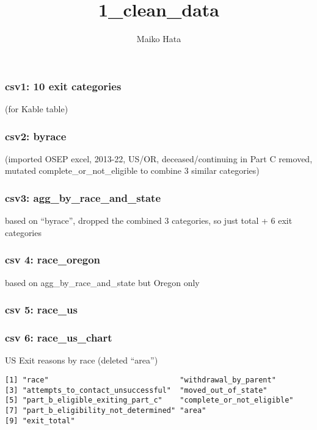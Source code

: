 \documentclass[
  letterpaper,
  DIV=11,
  numbers=noendperiod]{scrartcl}
\title{1\_clean\_data}
\author{Maiko Hata}
\date{}
\begin{document}
\maketitle


\subsubsection{csv1: 10 exit categories}\label{csv1-10-exit-categories}

(for Kable table)

\subsubsection{csv2: byrace}\label{csv2-byrace}

(imported OSEP excel, 2013-22, US/OR, deceased/continuing in Part C
removed, mutated complete\_or\_not\_eligible to combine 3 similar
categories)

\subsubsection{csv3:
agg\_by\_race\_and\_state}\label{csv3-agg_by_race_and_state}

based on ``byrace'', dropped the combined 3 categories, so just total +
6 exit categories

\subsubsection{csv 4: race\_oregon}\label{csv-4-race_oregon}

based on agg\_by\_race\_and\_state but Oregon only

\subsubsection{csv 5: race\_us}\label{csv-5-race_us}

\subsubsection{csv 6: race\_us\_chart}\label{csv-6-race_us_chart}

US Exit reasons by race (deleted ``area'')

\begin{verbatim}
[1] "race"                              "withdrawal_by_parent"             
[3] "attempts_to_contact_unsuccessful"  "moved_out_of_state"               
[5] "part_b_eligible_exiting_part_c"    "complete_or_not_eligible"         
[7] "part_b_eligibility_not_determined" "area"                             
[9] "exit_total"                       
\end{verbatim}
\end{document}
